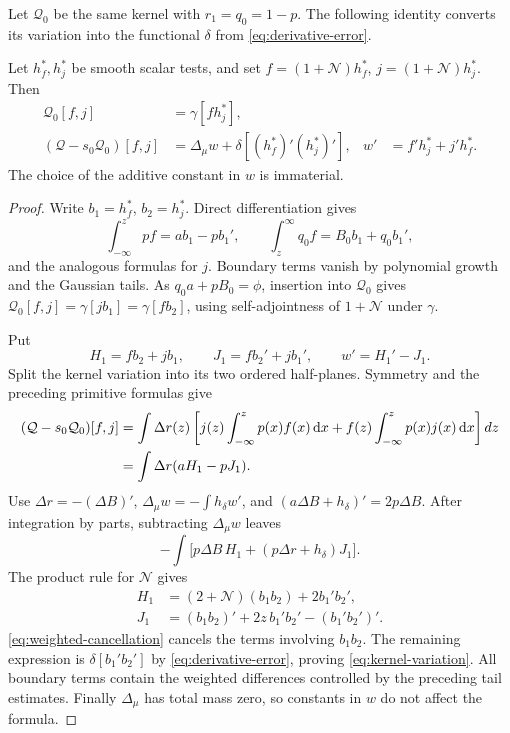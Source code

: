 Let $\mathcal{Q}_0$ be the same kernel with $r_1=q_0=1-p$. The following identity converts its variation into the functional $\delta$ from \eqref{eq:derivative-error}.

\begin{lemma}\label{lem:kernel-variation}
 Let $h_f^*,h_j^*$ be smooth scalar tests, and set $f=(1+\mathcal{N})h_f^*$, $j=(1+\mathcal{N})h_j^*$. Then
 \begin{equation}\label{eq:kernel-variation}
 \begin{aligned}
  \mathcal{Q}_0[f,j]&=\gamma[f h_j^*],\\
  (\mathcal{Q}-s_0\mathcal{Q}_0)[f,j]
    &=\Delta_\mu w+\delta[(h_f^*)'(h_j^*)'],&
  w'&=f'h_j^*+j'h_f^* .
 \end{aligned}
 \end{equation}
 The choice of the additive constant in $w$ is immaterial.
\end{lemma}

\begin{proof}
Write $b_1=h_f^*$, $b_2=h_j^*$. Direct differentiation gives
\[
 \int_{-\infty}^z p f=a b_1-p b_1',\qquad
 \int_z^\infty q_0 f=B_0 b_1+q_0 b_1',
\]
and the analogous formulas for $j$. Boundary terms vanish by polynomial growth and the Gaussian tails. As $q_0a+pB_0=\phi$, insertion into $\mathcal{Q}_0$ gives $\mathcal{Q}_0[f,j]=\gamma[jb_1]=\gamma[fb_2]$, using self-adjointness of $1+\mathcal{N}$ under $\gamma$.

Put
\[
 H_1=fb_2+jb_1,\qquad J_1=fb_2'+jb_1',\qquad w'=H_1'-J_1.
\]
Split the kernel variation into its two ordered half-planes. Symmetry and the preceding primitive formulas give
\[
 \begin{aligned}
 (\mathcal{Q}-s_0\mathcal{Q}_0)[f,j]
 &=\int\Delta r(z)\left[
       j(z)\int_{-\infty}^z p(x)f(x)\,\mathrm{d} x
       +f(z)\int_{-\infty}^z p(x)j(x)\,\mathrm{d} x\right]dz\\
 &=\int\Delta r(aH_1-pJ_1).
 \end{aligned}
\]
Use $\Delta r=-(\Delta B)'$, $\Delta_\mu w=-\int h_\delta w'$, and $(a\Delta B+h_\delta)'=2p\Delta B$. After integration by parts, subtracting $\Delta_\mu w$ leaves
\[
 -\int\bigl[p\Delta B\,H_1+(p\Delta r+h_\delta)J_1\bigr].
\]
The product rule for $\mathcal{N}$ gives
\[
 \begin{aligned}
 H_1&=(2+\mathcal{N})(b_1b_2)+2b_1'b_2',\\
 J_1&=(b_1b_2)'+2z\,b_1'b_2'-(b_1'b_2')'.
 \end{aligned}
\]
\eqref{eq:weighted-cancellation} cancels the terms involving $b_1b_2$. The remaining expression is $\delta[b_1'b_2']$ by \eqref{eq:derivative-error}, proving \eqref{eq:kernel-variation}. All boundary terms contain the weighted differences controlled by the preceding tail estimates. Finally $\Delta_\mu$ has total mass zero, so constants in $w$ do not affect the formula.
\end{proof}

